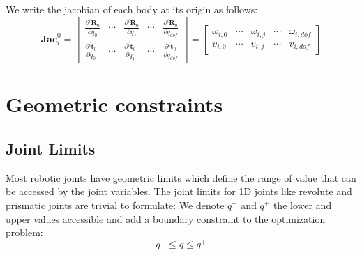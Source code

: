 We write the jacobian of each body at its origin as follows:
\begin{equation}
  \mathbf{Jac}^0_i =
  \begin{bmatrix}
    \frac{\partial {}^i\mathbf{R}_0}{\partial q_0} & \cdots &
    \frac{\partial {}^i\mathbf{R}_0}{\partial q_j} & \cdots &
    \frac{\partial {}^i\mathbf{R}_0}{\partial q_{dof}} \\
    \frac{\partial {}^i\mathbf{t}_0}{\partial q_0} & \cdots &
    \frac{\partial {}^i\mathbf{t}_0}{\partial q_j} & \cdots &
    \frac{\partial {}^i\mathbf{t}_0}{\partial q_{dof}}
  \end{bmatrix}
=
  \begin{bmatrix}
    \omega_{i,0} & \cdots &
    \omega_{i,j} & \cdots &
    \omega_{i,dof} \\
    v_{i,0} & \cdots &
    v_{i,j} & \cdots &
    v_{i,dof}
  \end{bmatrix}
\end{equation}



\section{Geometric constraints}
\label{sec:geometric_constraints}


\subsection{Joint Limits}
\label{sub:joint_limits}


Most robotic joints have geometric limits which define the range of value that can be accessed by the joint variables.
The joint limits for 1D joints like revolute and prismatic joints are trivial to formulate: We denote $q^-$ and $q^+$ the lower and upper values accessible and add a boundary constraint to the optimization problem:
\begin{equation}
\label{eq:joint_limits}
  \boxed{q^- \leq q \leq q^+}
\end{equation}


